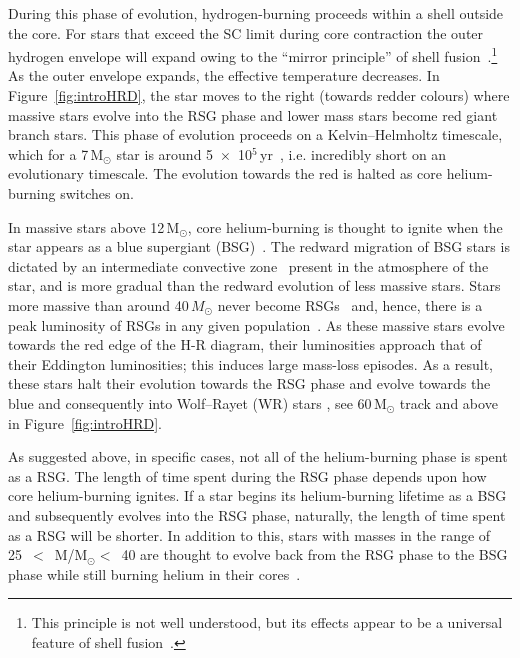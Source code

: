 During this phase of evolution, hydrogen-burning proceeds within a shell outside the core.
For stars that exceed the SC limit during core contraction the outer hydrogen envelope will expand owing to the ``mirror principle'' of shell fusion~\citep[e.g.][]{2012MNRAS.421.2713B}.\footnote{This principle is not well understood, but its effects appear to be a universal feature of shell fusion~\citep{2000ApJ...538..837S,2009PASA...26..203S,2012MNRAS.421.2713B}.}
As the outer envelope expands, the effective temperature decreases.
In Figure~\ref{fig:introHRD}, the star moves to the right (towards redder colours) where massive stars evolve into the RSG phase and lower mass stars become red giant branch stars.
This phase of evolution proceeds on a Kelvin--Helmholtz timescale, which for a 7\,M$_{\odot}$ star is around 5~$\times$~10$^{5}$\,yr~\citep{2012sse..book.....K}, i.e. incredibly short on an evolutionary timescale.
The evolution towards the red is halted as core helium-burning switches on.



In massive stars above 12\,M$_{\odot}$, core helium-burning is thought to ignite when the star appears as a blue supergiant (BSG)~\citep{Meynet11,2012A&A...537A.146E,Langer12,Saio13}.
The redward migration of BSG stars is dictated by an intermediate convective zone~\citep{Meynet11} present in the atmosphere of the star, and is more gradual than the redward evolution of less massive stars.
Stars more massive than around 40\,$M_{\odot}$ never become RSGs~\citep{Massey03,Meynet11,2012A&A...537A.146E} and, hence, there is a peak luminosity of RSGs in any given population~\citep{1979ApJ...232..409H}.
As these massive stars evolve towards the red edge of the H-R diagram, their luminosities approach that of their Eddington luminosities; this induces large mass-loss episodes.
As a result, these stars halt their evolution towards the RSG phase and evolve towards the blue and consequently into Wolf--Rayet (WR) stars
\citep{2007ARA&A..45..177C, Vink09}, see 60\,M$_{\odot}$ track and above in Figure~\ref{fig:introHRD}.

As suggested above, in specific cases, not all of the helium-burning phase is spent as a RSG.
The length of time spent during the RSG phase depends upon how core helium-burning ignites.
If a star begins its helium-burning lifetime as a BSG and subsequently evolves into the RSG phase, naturally, the length of time spent as a RSG will be shorter.
In addition to this, stars with masses in the range of 25~$<$~M/M$_{\odot}<$~40 are thought to evolve back from the RSG phase to the BSG phase while still burning helium in their cores~\citep{2012A&A...537A.146E}.

